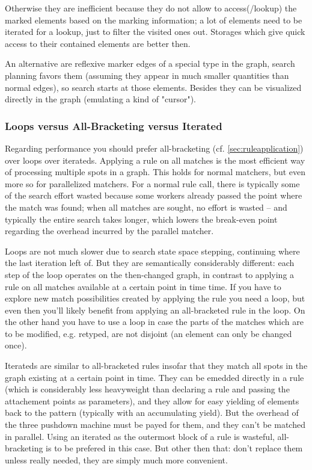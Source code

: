 Otherwise they are inefficient because they do not allow to access(/lookup) the marked elements based on the marking information;
a lot of elements need to be iterated for a lookup, just to filter the visited ones out.
Storages which give quick access to their contained elements are better then.

An alternative are reflexive marker edges of a special type in the graph, search planning favors them (assuming they appear in much smaller quantities than normal edges),  so search starts at those elements. 
Besides they can be visualized directly in the graph (emulating a kind of "cursor").

\subsubsection*{Loops versus All-Bracketing versus Iterated}
Regarding performance you should prefer all-bracketing (cf. \ref{sec:ruleapplication}) over loops over iterateds.
Applying a rule on all matches is the most efficient way of processing multiple spots in a graph.
This holds for normal matchers, but even more so for parallelized matchers.
For a normal rule call, there is typically some of the search effort wasted because some workers already passed the point where the match was found; when all matches are sought, no effort is wasted -- and typically the entire search takes longer, which lowers the break-even point regarding the overhead incurred by the parallel matcher.

Loops are not much slower due to search state space stepping, continuing where the last iteration left of.
But they are semantically considerably different: each step of the loop operates on the then-changed graph, in contrast to applying a rule on all matches available at a certain point in time time.
If you have to explore new match possibilities created by applying the rule you need a loop, but even then you'll likely benefit from applying an all-bracketed rule in the loop.
On the other hand you have to use a loop in case the parts of the matches which are to be modified, e.g. retyped, are not disjoint (an element can only be changed once).

Iterateds are similar to all-bracketed rules insofar that they match all spots in the graph existing at a certain point in time.
They can be emedded directly in a rule (which is considerably less heavyweight than declaring a rule and passing the attachement points as parameters), and they allow for easy yielding of elements back to the pattern (typically with an accumulating yield).
But the overhead of the three pushdown machine must be payed for them, and they can't be matched in parallel.
Using an iterated as the outermost block of a rule is wasteful, all-bracketing is to be prefered in this case.
But other then that: don't replace them unless really needed, they are simply much more convenient.

